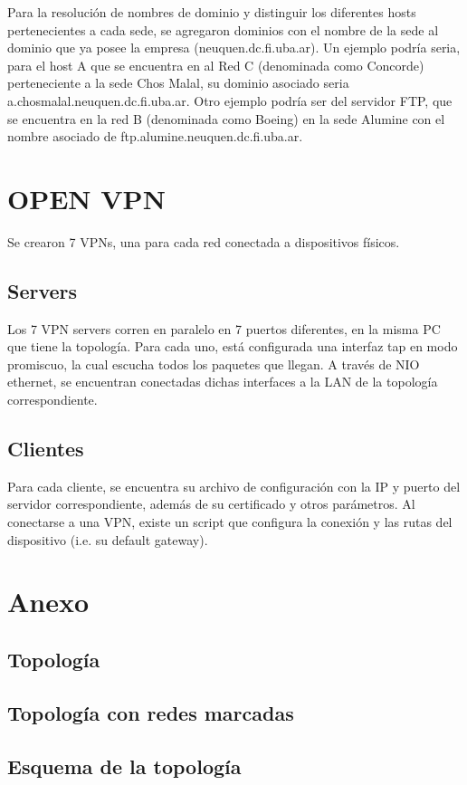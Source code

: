 \documentclass[12pt,a4paper,spanish]{article}
\begin{document}
Para la resolución de nombres de dominio y distinguir los diferentes hosts pertenecientes a cada sede, se agregaron dominios con el nombre de la sede al dominio que ya posee la empresa (neuquen.dc.fi.uba.ar). Un ejemplo podría seria, para el host A que se encuentra en al Red C (denominada como Concorde) perteneciente a la sede Chos Malal, su dominio asociado seria a.chosmalal.neuquen.dc.fi.uba.ar. Otro ejemplo podría ser del servidor FTP, que se encuentra en la red B (denominada como Boeing) en la sede Alumine con el nombre asociado de ftp.alumine.neuquen.dc.fi.uba.ar.

\section{OPEN VPN}
Se crearon 7 VPNs, una para cada red conectada a dispositivos físicos.
\subsection{Servers}
Los 7 VPN servers corren en paralelo en 7 puertos diferentes, en la misma PC que tiene la topología.
Para cada uno, está configurada una interfaz tap en modo promiscuo, la cual escucha todos los paquetes que llegan.
A través de NIO ethernet, se encuentran conectadas dichas interfaces a la LAN de la topología correspondiente.
\subsection{Clientes}
Para cada cliente, se encuentra su archivo de configuración con la IP y puerto del servidor correspondiente, además de su certificado
y otros parámetros.
Al conectarse a una VPN, existe un script que configura la conexión y las rutas del dispositivo (i.e. su default gateway).

\newpage
\section{Anexo}
\subsection{Topología}
\subsection{Topología con redes marcadas}

\subsection{Esquema de la topología}
\end{document}
